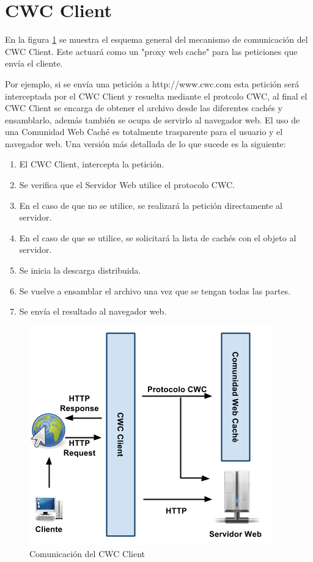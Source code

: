 \section{CWC Client}
En la figura \ref{ComunicacionCWCClient} se muestra el esquema general del mecanismo de comunicación del CWC Client. Este actuará como un "proxy web cache" para las peticiones que envía el cliente. 

Por ejemplo, si se envía una petición a http://www.cwc.com esta petición será interceptada por el CWC Client y resuelta mediante el protcolo CWC, al final el CWC Client se encarga de obtener el archivo desde las diferentes cachés y ensamblarlo, además también se ocupa de servirlo al navegador web. El uso de una Comunidad Web Caché es totalmente trasparente para el usuario y el navegador web. Una versión más detallada de lo que sucede es la siguiente:

\begin{enumerate}
\item El CWC Client, intercepta la petición.
\item Se verifica que el Servidor Web utilice el protocolo CWC.
\item En el caso de que no se utilice, se realizará la petición directamente al servidor.
\item En el caso de que se utilice, se solicitará la lista de cachés con el objeto al servidor.
\item Se inicia la descarga distribuida.
\item Se vuelve a ensamblar el archivo una vez que se tengan todas las partes.
\item Se envía el resultado al navegador web.
\end{enumerate}

\begin{figure}
  \centering
    \includegraphics[scale=0.75]{gfx/ComunicacionCWCClient}
  \caption{Comunicación del CWC Client}
  \label{ComunicacionCWCClient}
\end{figure}

